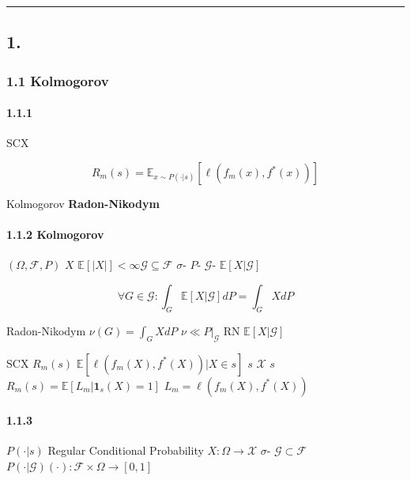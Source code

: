 \documentclass[
  12pt,
]{article}
\begin{document}
\begin{center}\rule{0.5\linewidth}{0.5pt}\end{center}

\subsection{1. }\label{ux6570ux5b66ux6839ux6e90ux8ffdux6eaf}

\subsubsection{1.1  Kolmogorov
}\label{ux6761ux4ef6ux98ceux9669ux4e0e-kolmogorov-ux516cux7406ux4f53ux7cfb}

\paragraph{1.1.1
}\label{ux6838ux5fc3ux5bf9ux8c61ux518dux5b9aux4e49}

SCX 

\[R_m(s) = \mathbb{E}_{x \sim P(\cdot|s)}[\ell(f_m(x), f^*(x))]\]

 Kolmogorov
\textbf{}\textbf{}
 \textbf{Radon-Nikodym }

\paragraph{1.1.2 Kolmogorov
}\label{kolmogorov-ux6761ux4ef6ux671fux671bux7684ux6b63ux5f0fux5b9aux4e49}

 \((\Omega, \mathcal{F}, P)\) \(X\) 
\(\mathbb{E}[|X|] < \infty\)\(\mathcal{G} \subseteq \mathcal{F}\) 
\(\sigma\)- \(P\)- \(\mathcal{G}\)-
\(\mathbb{E}[X|\mathcal{G}]\)

\[\forall G \in \mathcal{G}: \int_G \mathbb{E}[X|\mathcal{G}] dP = \int_G X dP\]

\textbf{} Radon-Nikodym 
\(\nu(G) = \int_G X dP\) \(\nu \ll P|_{\mathcal{G}}\) RN
 \(\mathbb{E}[X|\mathcal{G}]\)

SCX  \(R_m(s)\) 
\(\mathbb{E}[\ell(f_m(X), f^*(X)) | X \in s]\) \(s\) 
\(\mathcal{X}\)  \(s\)
\(R_m(s) = \mathbb{E}[L_m | \mathbf{1}_s(X)=1]\)
\(L_m = \ell(f_m(X), f^*(X))\)

\paragraph{1.1.3
}\label{ux6b63ux5219ux6761ux4ef6ux6982ux7387}

 \(P(\cdot|s)\) Regular Conditional
Probability \(X: \Omega \to \mathcal{X}\) 
\(\sigma\)- \(\mathcal{G} \subset \mathcal{F}\)
\(P(\cdot|\mathcal{G})(\cdot): \mathcal{F} \times \Omega \to [0,1]\)
\end{document}
